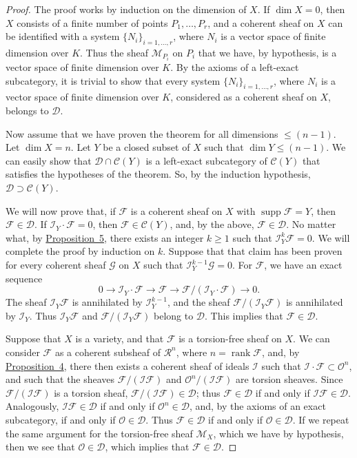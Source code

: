 \documentclass{article}
\newcommand{\scr}[1]{{\mathscr{#1}}}
\renewcommand{\cal}[1]{{\mathcal{#1}}}
\renewcommand{\geq}{\geqslant}
\renewcommand{\leq}{\leqslant}
\DeclareMathOperator{\supp}{supp}
\DeclareMathOperator{\rank}{rank}
\newcommand{\oldpage}[1]{\marginpar{\footnotesize$\Big\vert$ \textit{p.~#1}}}
\begin{document}
\begin{proof}
  The proof works by induction on the dimension of $X$.
  If $\dim X=0$, then $X$ consists of a finite number of points $P_1,\ldots,P_r$, and a coherent sheaf on $X$ can be identified with a system $\{N_i\}_{i=1,\ldots,r}$, where $N_i$ is a vector space of finite dimension over $K$.
  Thus the sheaf $\scr{M}_{P_i}$ on $P_i$ that we have, by hypothesis, is a vector space of finite dimension over $K$.
  By the axioms of a left-exact subcategory, it is trivial to show that every system $\{N_i\}_{i=1,\ldots,r}$, where $N_i$ is a vector space of finite dimension over $K$, considered as a coherent sheaf on $X$, belongs to $\cal{D}$.

  Now assume that we have proven the theorem for all dimensions $\leq (n-1)$.
  Let $\dim X=n$.
  Let $Y$ be a closed subset of $X$ such that $\dim Y\leq(n-1)$.
  We can easily show that $\cal{D}\cap\cal{C}(Y)$ is a left-exact subcategory of $\cal{C}(Y)$ that satisfies the hypotheses of the theorem.
  So, by the induction hypothesis, $\cal{D}\supset\cal{C}(Y)$.

  We will now prove that, if $\scr{F}$ is a coherent sheaf on $X$ with $\supp\scr{F}=Y$, then $\scr{F}\in\cal{D}$.
  If $\scr{I}_Y\cdot\scr{F}=0$, then $\scr{F}\in\cal{C}(Y)$, and, by the above, $\scr{F}\in\cal{D}$.
  No matter what, by \hyperref[proposition5]{Proposition~5}, there exists an integer $k\geq1$ such that $\scr{I}_Y^k\scr{F}=0$.
  We will complete the proof by induction on $k$.
  Suppose that that claim has been proven for every coherent sheaf $\scr{G}$ on $X$ such that $\scr{I}_Y^{k-1}\scr{G}=0$.
  For $\scr{F}$, we have an exact sequence
  \[
    0 \to \scr{I}_Y\cdot\scr{F} \to \scr{F} \to \scr{F}/(\scr{I}_Y\cdot\scr{F}) \to 0.
  \]
  The sheaf $\scr{I}_Y\scr{F}$ is annihilated by $\scr{I}_Y^{k-1}$, and the sheaf $\scr{F}/(\scr{I}_Y\scr{F})$ is annihilated by $\scr{I}_Y$.
  Thus $\scr{I}_Y\scr{F}$ and $\scr{F}/(\scr{I}_Y\scr{F})$ belong to $\cal{D}$.
  This implies that $\scr{F}\in\cal{D}$.

  Suppose that $X$ is a variety, and that $\scr{F}$ is a torsion-free sheaf on $X$.
  We can consider $\scr{F}$ as a coherent subsheaf of $\scr{R}^n$, where $n=\rank\scr{F}$, and, by \hyperref[proposition4]{Proposition~4}, there then exists a coherent sheaf of ideals $\scr{I}$ such that $\scr{I}\cdot\scr{F}\subset\scr{O}^n$, and such that the sheaves $\scr{F}/(\scr{I}\scr{F})$ and $\scr{O}^n/(\scr{I}\scr{F})$ are torsion sheaves.
  Since $\scr{F}/(\scr{I}\scr{F})$ is a torsion sheaf, $\scr{F}/(\scr{I}\scr{F})\in\cal{D}$;
  thus $\scr{F}\in\cal{D}$ if and only if $\scr{I}\scr{F}\in\cal{D}$.
  Analogously, $\scr{I}\scr{F}\in\cal{D}$ if and only if $\scr{O}^n\in\cal{D}$, and, by the axioms of an exact subcategory, if and only if $\scr{O}\in\cal{D}$.
  Thus $\scr{F}\in\cal{D}$ if and only if
\oldpage{4-05}
  $\scr{O}\in\cal{D}$.
  If we repeat the same argument for the torsion-free sheaf $\scr{M}_X$, which we have by hypothesis, then we see that $\scr{O}\in\cal{D}$, which implies that $\scr{F}\in\cal{D}$.


\end{proof}
\end{document}
